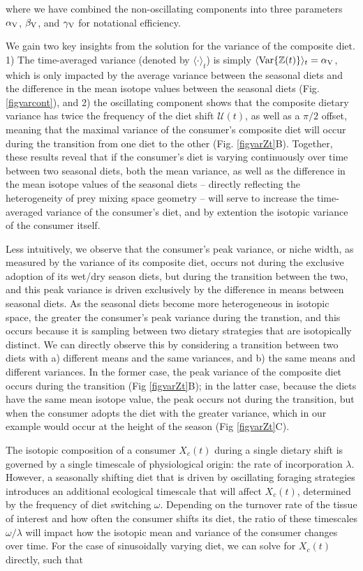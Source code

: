 \documentclass{frontiersSCNS}
\begin{document}
\noindent where we have combined the non-oscillating components into three parameters $\alpha_{\rm V}$, $\beta_{\rm V}$, and $\gamma_{\rm V}$ for notational efficiency.

We gain two key insights from the solution for the variance of the composite diet.
1) The time-averaged variance (denoted by $\langle \cdot
\rangle_t$) is simply $\langle {\rm Var}\{\mathbb{Z}(t)\} \rangle_t = \alpha_{\rm V}$, which is only impacted by the average variance between the seasonal diets and the difference in the mean isotope values between the seasonal diets (Fig. \ref{figvarcont}), and
2) the oscillating component shows that the composite dietary variance has twice the frequency of the diet shift $\mathcal{U}(t)$, as well as a $\pi/2$ offset, meaning that the maximal variance of the consumer's composite diet will occur during the transition from one diet to the other (Fig. \ref{figvarZt}B).
Together, these results reveal that if the consumer's diet is varying continuously over time between two seasonal diets, both the mean variance, as well as the difference in the mean isotope values of the seasonal diets -- directly reflecting the heterogeneity of prey mixing space geometry -- will serve to increase the time-averaged variance of the consumer's diet, and by extention the isotopic variance of the consumer itself.

Less intuitively, we observe that the consumer's peak variance, or niche width, as measured by the variance of its composite diet, occurs not during the exclusive adoption of its wet/dry season diets, but during the transition between the two, and this peak variance is driven exclusively by the difference in means between seasonal diets.
As the seasonal diets become more heterogeneous in isotopic space, the greater the consumer's peak variance during the transtion, and this occurs because it is sampling between two dietary strategies that are isotopically distinct.
We can directly observe this by considering a transition between two diets with  a) different means and the same variances, and b) the same means and different variances.
In the former case, the peak variance of the composite diet occurs during the transition (Fig \ref{figvarZt}B); in the latter case, because the diets have the same mean isotope value, the peak occurs not during the transition, but when the consumer adopts the diet with the greater variance, which in our example would occur at the height of the season (Fig \ref{figvarZt}C).

The isotopic composition of a consumer $X_c(t)$ during a single dietary shift is governed by a single timescale of physiological origin: the rate of incorporation $\lambda$.
However, a seasonally shifting diet that is driven by oscillating foraging strategies introduces an additional ecological timescale that will affect $X_c(t)$, determined by the frequency of diet switching $\omega$.
Depending on the turnover rate of the tissue of interest and how often the consumer shifts its diet, the ratio of these timescales $\omega/\lambda$ will impact how the isotopic mean and variance of the consumer changes over time.
For the case of sinusoidally varying diet, we can solve for $X_c(t)$ directly, such that
\end{document}
